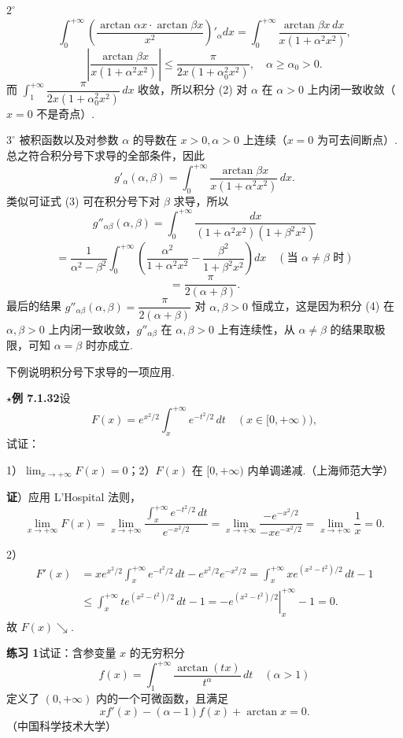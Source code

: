 \documentclass[UTF8,12pt,a4paper,fontset=fandol]{ctexart}
\begin{document}
$2^\circ$
\[
\int_0^{+\infty}\left(\frac{\arctan\alpha x\cdot\arctan\beta x}{x^2}\right)'_\alpha dx
=\int_0^{+\infty}\frac{\arctan\beta x\,dx}{x(1+\alpha^2x^2)},
\tag{2}
\]
\[
\left|\frac{\arctan\beta x}{x(1+\alpha^2x^2)}\right|
\le\frac{\pi}{2x(1+\alpha_0^2x^2)},\quad \alpha\ge\alpha_0>0.
\]
而 $\displaystyle\int_1^{+\infty}\dfrac{\pi}{2x(1+\alpha_0^2x^2)}\,dx$ 收敛，所以积分 (2) 对 $\alpha$ 在 $\alpha>0$ 上内闭一致收敛（$x=0$ 不是奇点）.

$3^\circ$ 被积函数以及对参数 $\alpha$ 的导数在 $x>0,\alpha>0$ 上连续（$x=0$ 为可去间断点）. 总之符合积分号下求导的全部条件，因此
\[
g'_\alpha(\alpha,\beta)=\int_0^{+\infty}\frac{\arctan\beta x}{x(1+\alpha^2x^2)}\,dx.
\tag{3}
\]
类似可证式 (3) 可在积分号下对 $\beta$ 求导，所以
\[
g''_{\alpha\beta}(\alpha,\beta)
=\int_0^{+\infty}\frac{dx}{(1+\alpha^2x^2)(1+\beta^2x^2)}
\tag{4}
\]
\[
=\frac1{\alpha^2-\beta^2}\int_0^{+\infty}\left(\frac{\alpha^2}{1+\alpha^2x^2}-\frac{\beta^2}{1+\beta^2x^2}\right)dx\quad(\text{当 }\alpha\ne\beta\text{ 时})
\]
\[
=\frac{\pi}{2(\alpha+\beta)}.
\]
最后的结果 $g''_{\alpha\beta}(\alpha,\beta)=\dfrac{\pi}{2(\alpha+\beta)}$ 对 $\alpha,\beta>0$ 恒成立，这是因为积分 (4) 在 $\alpha,\beta>0$ 上内闭一致收敛，$g''_{\alpha\beta}$ 在 $\alpha,\beta>0$ 上有连续性，从 $\alpha\ne\beta$ 的结果取极限，可知 $\alpha=\beta$ 时亦成立.

下例说明积分号下求导的一项应用.

\noindent\textbf{$\star$例 7.1.32}\quad 设
\[
F(x)=e^{x^2/2}\int_x^{+\infty}e^{-t^2/2}\,dt\quad(x\in[0,+\infty)),
\]
试证：

1）$\displaystyle\lim_{x\to+\infty}F(x)=0$；2）$F(x)$ 在 $[0,+\infty)$ 内单调递减.（上海师范大学）

\noindent\textbf{证}）应用 L'Hospital 法则，
\[
\lim_{x\to+\infty}F(x)=\lim_{x\to+\infty}\frac{\displaystyle\int_x^{+\infty}e^{-t^2/2}\,dt}{e^{-x^2/2}}
=\lim_{x\to+\infty}\frac{-e^{-x^2/2}}{-xe^{-x^2/2}}
=\lim_{x\to+\infty}\frac1x=0.
\]

2）
\[
\begin{aligned}
F'(x)
&=xe^{x^2/2}\int_x^{+\infty}e^{-t^2/2}\,dt-e^{x^2/2}e^{-x^2/2}
=\int_x^{+\infty}xe^{(x^2-t^2)/2}\,dt-1\\
&\le\int_x^{+\infty}te^{(x^2-t^2)/2}\,dt-1
=-\left.e^{(x^2-t^2)/2}\right|_x^{+\infty}-1=0.
\end{aligned}
\]
故 $F(x)\searrow$.

\noindent\textbf{练习 1}\quad 试证：含参变量 $x$ 的无穷积分
\[
f(x)=\int_1^{+\infty}\frac{\arctan(tx)}{t^\alpha}\,dt\quad(\alpha>1)
\tag{1}
\]
定义了 $(0,+\infty)$ 内的一个可微函数，且满足
\[
xf'(x)-(\alpha-1)f(x)+\arctan x=0.
\tag{2}
\]
（中国科学技术大学）
\end{document}
